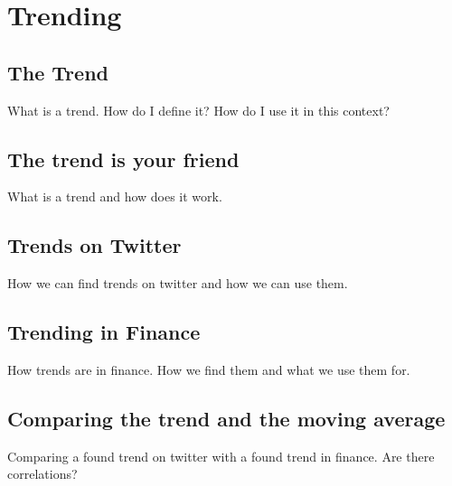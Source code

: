 
\chapter{Trending}

\section{The Trend}
What is a trend. How do I define it? How do I use it in this context? 

\section{The trend is your friend}
What is a trend and how does it work. 

\section{Trends on Twitter}
How we can find trends on twitter and how we can use them. 
\section{Trending in Finance}
How trends are in finance. How we find them and what we use them for. 
\section{Comparing the trend and the moving average}
Comparing a found trend on twitter with a found trend in finance. Are there
correlations?   
